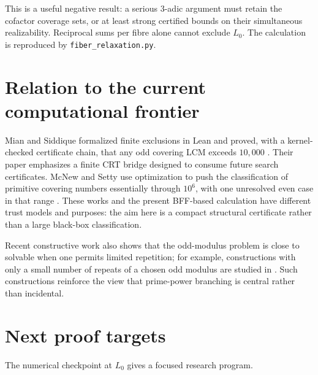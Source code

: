 \documentclass[11pt]{article}
\theoremstyle{definition}
\begin{document}
This is a useful negative result: a serious $3$-adic argument must retain the cofactor coverage
sets, or at least strong certified bounds on their simultaneous realizability.  Reciprocal sums
per fibre alone cannot exclude $L_0$.  The calculation is reproduced by
\texttt{fiber\_relaxation.py}.

\section{Relation to the current computational frontier}

Mian and Siddique formalized finite exclusions in Lean and proved, with a kernel-checked
certificate chain, that any odd covering LCM exceeds $10{,}000$ \cite{MianSiddique2026}.  Their
paper emphasizes a finite CRT bridge designed to consume future search certificates.  McNew and
Setty use optimization to push the classification of primitive covering numbers essentially
through $10^6$, with one unresolved even case in that range \cite{McNewSetty2026}.  These works
and the present BFF-based calculation have different trust models and purposes: the aim here is
a compact structural certificate rather than a large black-box classification.

Recent constructive work also shows that the odd-modulus problem is close to solvable when one
permits limited repetition; for example, constructions with only a small number of repeats of a
chosen odd modulus are studied in \cite{Bispels2025}.  Such constructions reinforce the view
that prime-power branching is central rather than incidental.

\section{Next proof targets}

The numerical checkpoint at $L_0$ gives a focused research program.
\end{document}
